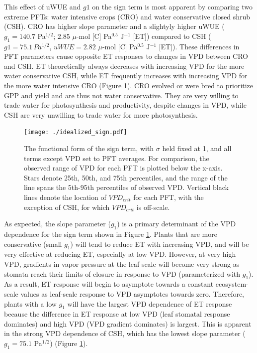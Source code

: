 \documentclass[draft,linenumbers]{agujournal}
\begin{document}
This effect of uWUE and $g1$ on the sign term is most apparent by comparing two extreme PFTs: water intensive crops (CRO) and water conservative closed shrub (CSH). CRO has higher slope parameter and a slightyly higher uWUE ($g_1 = 140.7$ Pa$^{1/2}$; $2.85$ $\mu$-mol [C] Pa$^{0.5}$ J$^{-1}$ [ET]) compared to CSH ($g1 = 75.1 \, Pa^{1/2}$, $uWUE=2.82$ $\mu$-mol [C] Pa$^{0.5}$ J$^{-1}$ [ET]). These differences in PFT parameters cause opposite ET responses to changes in VPD between CRO and CSH. ET theoretically always decreases with increasing VPD for the more water conservative CSH, while ET frequently  increases with increasing VPD for the more water intensive CRO (Figure \ref{idealized_sign}). CRO evolved or were bred to prioritize GPP and yield and are thus not water conservative. They are very willing to trade water for photosynthesis and productivity, despite changes in VPD, while CSH are very unwilling to trade water for more photosynthesis.

\begin{figure}
\centering
\texttt{[image: ./idealized\_sign.pdf]}
\caption{The functional form of the sign term, with $\sigma$ held fixed at 1, and all terms except VPD set to PFT averages. For comparison, the observed range of VPD for each PFT is plotted below the x-axis. Stars denote 25th, 50th, and 75th percentiles, and the range of the line spans the 5th-95th percentiles of observed VPD. Vertical black lines denote the location of $VPD_{crit}$ for each PFT, with the exception of CSH, for which $VPD_{crit}$ is off-scale.}
\label{idealized_sign}
\end{figure}


As expected, the slope parameter ($g_1$) is a primary determinant of the VPD dependence for the sign term shown in Figure \ref{idealized_sign}. Plants that are more conservative (small $g_1$) will tend to reduce ET with increasing VPD, and will be very effective at reducing ET, especially at low VPD. However, at very high VPD, gradients in vapor pressure at the leaf scale will become very strong as stomata reach their limits of closure in response to VPD (parameterized with $g_1$). As a result, ET response will begin to asymptote towards a constant ecosystem-scale values as leaf-scale response to VPD asymptotes towards zero.  Therefore, plants with a low $g_1$ will have the largest VPD dependence of ET response because the difference in ET response at low VPD (leaf stomatal response dominates) and high VPD (VPD gradient dominates) is largest. This is apparent in the strong VPD dependence of CSH, which has the lowest slope parameter ($g_1=75.1$ Pa$^{1/2}$) (Figure \ref{idealized_sign}).
\end{document}
